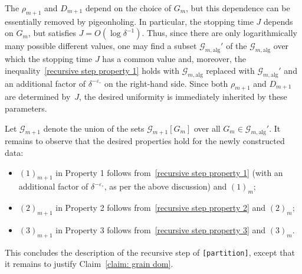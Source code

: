 \documentclass[reqno]{amsart}
\numberwithin{equation}{section}
\newcommand{\cG}{\mathcal{G}}
\theoremstyle{plain}
\theoremstyle{definition}
\newcommand{\alg}{\mathrm{alg}}
\begin{document}
The $\rho_{m+1}$ and $D_{m+1}$ depend on the choice of $G_m$, but this dependence can be essentially removed by pigeonholing. In particular, the stopping time $J$ depends on $G_m$, but satisfies $J= O(\log \delta^{-1})$. Thus, since there are only logarithmically many possible different values, one may find a subset $\cG_{m,\alg}'$ of the $\cG_{m,\alg}$ over which the stopping time $J$ has a common value and, moreover, the inequality~\eqref{recursive step property 1} holds with $\cG_{m,\alg}$ replaced with $\cG_{m,\alg}'$ and an additional factor of $\delta^{-\varepsilon_{\circ}}$ on the right-hand side. Since both $\rho_{m+1}$ and $D_{m+1}$ are determined by~$J$, the desired uniformity is immediately inherited by these parameters. 

Let $\cG_{m+1}$ denote the union of the sets $\cG_{m+1}[G_m]$ over all $G_m \in \cG_{m,\alg}'$. It remains to observe that the desired properties hold for the newly constructed data:
\begin{itemize}
    \item $(1)_{m+1}$ in Property 1 follows from~\eqref{recursive step property 1} (with an additional factor of $\delta^{-\varepsilon_{\circ}}$, as per the above discussion) and $(1)_m$;
    \item $(2)_{m+1}$ in Property 2 follows from~\eqref{recursive step property 2} and $(2)_m$;
    \item $(3)_{m+1}$ in Property 3 follows from~\eqref{recursive step property 3} and $(3)_m$.
\end{itemize}
This concludes the description of the recursive step of \texttt{[partition]}, except that it remains to justify Claim~\ref{claim: grain dom}.
\end{document}
